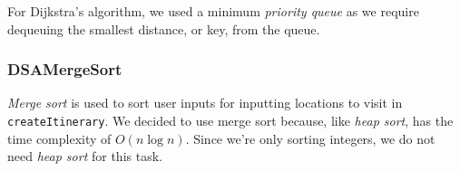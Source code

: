 \documentclass[a4paper, 12pt, titlepage]{article}
\newcommand{\code}[1]{\small\texttt{#1}\normalsize}
\begin{document}
For Dijkstra's algorithm, we used a minimum \textit{priority queue} as we
require dequeuing the smallest distance, or key, from the queue.

\subsubsection{DSAMergeSort}

\textit{Merge sort} is used to sort user inputs for inputting locations to
visit in \code{createItinerary}. We decided to use merge sort because, like
\textit{heap sort}, has the time complexity of $O(n\log{}n)$. Since we're only
sorting integers, we do not need \textit{heap sort} for this task.
\end{document}
